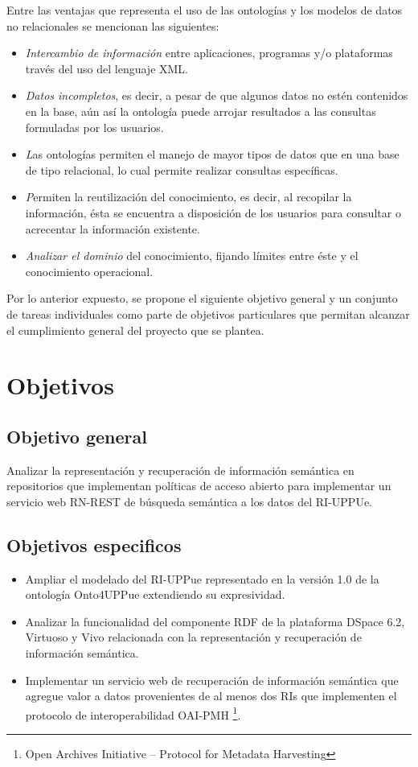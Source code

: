 Entre las ventajas que representa el uso de las ontologías y los modelos de datos no relacionales se mencionan las siguientes: \cite{ASWebQuest} \cite{GuideCreatingOntology}

\begin{itemize}
\item \textit{Intercambio de información} entre aplicaciones, programas y/o plataformas través del uso del lenguaje XML.
\item \textit{Datos incompletos}, es decir, a pesar de que algunos datos no estén contenidos en la base, aún así la ontología puede arrojar resultados a las consultas formuladas por los usuarios.
\item \textit Las ontologías permiten el manejo de mayor {tipos de datos} que en una base de tipo relacional, lo cual permite realizar consultas específicas.
\item \textit Permiten la {reutilización del conocimiento}, es decir, al recopilar la información, ésta se encuentra a disposición de los usuarios para consultar o acrecentar la información existente.
\item \textit{Analizar el dominio }del conocimiento, fijando límites entre éste y el conocimiento operacional.

\end{itemize}

Por lo anterior expuesto, se propone el siguiente objetivo general y un conjunto de tareas individuales como parte de objetivos particulares que permitan alcanzar el cumplimiento general del proyecto que se plantea.

\section{Objetivos}
\subsection{Objetivo general}
Analizar la representación y recuperación de información semántica 
en repositorios que implementan políticas de acceso abierto para implementar un servicio web RN-REST de búsqueda semántica a los datos del RI-UPPUe.
\subsection{Objetivos especificos}
\begin{itemize}
     \item  Ampliar el modelado del RI-UPPue representado en la versión 1.0 de la ontología Onto4UPPue extendiendo su expresividad.

     \item Analizar la funcionalidad del componente RDF de la plataforma DSpace 6.2, Virtuoso y Vivo relacionada con la representación y recuperación de información semántica.
     
     \item Implementar un servicio web de recuperación de información semántica que agregue valor a datos provenientes de al menos dos RIs que implementen el protocolo de interoperabilidad OAI-PMH \footnote{Open Archives Initiative – Protocol for Metadata Harvesting}.
   \end{itemize}
   
